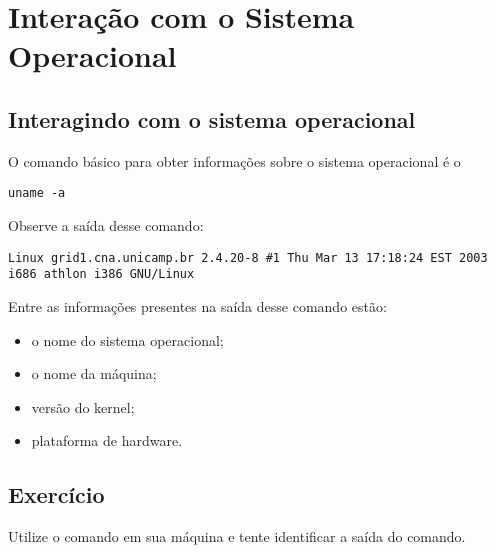\chapter{Interação com o Sistema Operacional}
\section{Interagindo com o sistema operacional}
O comando básico para obter informações sobre o sistema operacional é o

\begin{lstlisting}[style=MyBashStyle]
uname -a
\end{lstlisting}



Observe a saída desse comando:
\begin{lstlisting}[style=outputStyle]
Linux grid1.cna.unicamp.br 2.4.20-8 #1 Thu Mar 13 17:18:24 EST 2003 i686 athlon i386 GNU/Linux
\end{lstlisting}

Entre as informações presentes na saída desse comando estão:
\begin{itemize}
\setlength{\itemsep}{1pt}\setlength{\parskip}{0pt}  \setlength{\parsep}{0pt}
\item o nome do sistema operacional;
\item o nome da máquina;
\item versão do kernel;
\item plataforma de hardware.
\end{itemize}

\section{Exercício}
Utilize o comando  em sua máquina e tente identificar a saída do comando.
